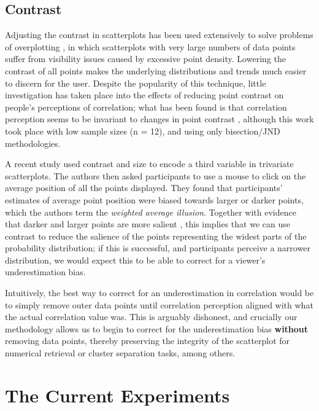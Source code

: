\documentclass[preprint, 3p,
authoryear]{elsarticle} %
\begin{document}
\hypertarget{contrast}{%
\subsection{Contrast}\label{contrast}}

Adjusting the contrast in scatterplots has been used extensively to
solve problems of overplotting \citep{matejka_2015, bertini_2004}, in
which scatterplots with very large numbers of data points suffer from
visibility issues caused by excessive point density. Lowering the
contrast of all points makes the underlying distributions and trends
much easier to discern for the user. Despite the popularity of this
technique, little investigation has taken place into the effects of
reducing point contrast on people's perceptions of correlation; what has
been found is that correlation perception seems to be invariant to
changes in point contrast \citep{rensink_2012}, although this work took
place with low sample sizes (n = 12), and using only bisection/JND
methodologies.

A recent study \citep{hong_2021} used contrast and size to encode a
third variable in trivariate scatterplots. The authors then asked
participants to use a mouse to click on the average position of all the
points displayed. They found that participants' estimates of average
point position were biased towards larger or darker points, which the
authors term the \emph{weighted average illusion}. Together with
evidence that darker and larger points are more salient
\citep{healey_2012}, this implies that we can use contrast to reduce the
salience of the points representing the widest parts of the probability
distribution; if this is successful, and participants perceive a
narrower distribution, we would expect this to be able to correct for a
viewer's underestimation bias.

Intuitively, the best way to correct for an underestimation in
correlation would be to simply remove outer data points until
correlation perception aligned with what the actual correlation value
was. This is arguably dishonest, and crucially our methodology allows us
to begin to correct for the underestimation bias \textbf{without}
removing data points, thereby preserving the integrity of the
scatterplot for numerical retrieval or cluster separation tasks, among
others.

\hypertarget{the-current-experiments}{%
\section{The Current Experiments}\label{the-current-experiments}}
\end{document}
